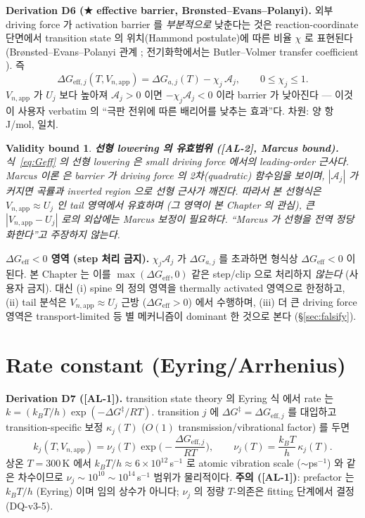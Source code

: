 \documentclass[11pt,a4paper]{article}
\newtheorem*{boundbox}{Validity bound}
\newcommand{\eff}{\mathrm{eff}}
\newcommand{\app}{\mathrm{app}}
\newcommand{\AL}[1]{\textsf{[AL-#1]}}
\begin{document}
\textbf{Derivation D6 (★ effective barrier, Brønsted--Evans--Polanyi).} 외부 driving
force 가 activation barrier 를 \emph{부분적으로} 낮춘다는 것은 reaction-coordinate
단면에서 transition state 의 위치(Hammond postulate)에 따른 비율 $\chi$ 로 표현된다
(Brønsted--Evans--Polanyi 관계 \cite{evanspolanyi1938}; 전기화학에서는 Butler--Volmer
transfer coefficient \cite{bardfaulkner}). 즉
\begin{equation}
\boxed{\;\Delta G_{\eff,j}(T,V_{n,\app}) = \Delta G_{a,j}(T) - \chi_j\,\mathcal A_j,
\qquad 0\le\chi_j\le1.\;}
\label{eq:Geff}
\end{equation}
$V_{n,\app}$ 가 $U_j$ 보다 높아져 $\mathcal A_j>0$ 이면 $-\chi_j\mathcal A_j<0$ 이라
barrier 가 낮아진다 — 이것이 사용자 verbatim 의 ``극판 전위에 따른 배리어를 낮추는
효과''다. 차원: 양 항 J/mol, 일치.

\begin{boundbox}
\textbf{선형 lowering 의 유효범위 (\AL{2}, Marcus bound).} 식~\eqref{eq:Geff} 의
선형 lowering 은 small driving force 에서의 leading-order 근사다. Marcus 이론
\cite{marcus1956} 은 barrier 가 driving force 의 \emph{2차(quadratic)} 함수임을 보이며,
$|\mathcal A_j|$ 가 커지면 곡률과 inverted region 으로 선형 근사가 깨진다. 따라서 본
선형식은 $V_{n,\app}\approx U_j$ 인 \emph{tail 영역}에서 유효하며 (그 영역이 본
Chapter 의 관심), 큰 $|V_{n,\app}-U_j|$ 로의 외삽에는 Marcus 보정이 필요하다. ``Marcus
가 선형을 전역 정당화한다''고 주장하지 않는다.
\end{boundbox}

\textbf{$\Delta G_\eff<0$ 영역 (step 처리 금지).} $\chi_j\mathcal A_j$ 가
$\Delta G_{a,j}$ 를 초과하면 형식상 $\Delta G_\eff<0$ 이 된다. 본 Chapter 는 이를
$\max(\Delta G_\eff,0)$ 같은 step/clip 으로 처리하지 \emph{않는다} (사용자 금지). 대신
(i) spine 의 정의 영역을 thermally activated 영역으로 한정하고, (ii) tail 분석은
$V_{n,\app}\approx U_j$ 근방 ($\Delta G_\eff>0$) 에서 수행하며, (iii) 더 큰 driving
force 영역은 transport-limited 등 별 메커니즘이 dominant 한 것으로 본다
(\S\ref{sec:falsify}).

\section{Rate constant (Eyring/Arrhenius)}\label{sec:rate}
\textbf{Derivation D7 (\AL{1}).} transition state theory 의 Eyring 식
\cite{eyring1935} 에서 rate 는 $k=(k_BT/h)\exp(-\Delta G^\ddagger/RT)$. transition $j$
에 $\Delta G^\ddagger=\Delta G_{\eff,j}$ 를 대입하고 transition-specific 보정
$\kappa_j(T)$ ($O(1)$ transmission/vibrational factor) 를 두면
\begin{equation}
\boxed{\;k_j(T,V_{n,\app}) = \nu_j(T)\exp\!\Big(-\frac{\Delta G_{\eff,j}}{RT}\Big),
\qquad \nu_j(T)=\frac{k_BT}{h}\,\kappa_j(T).\;}
\label{eq:rate}
\end{equation}
상온 $T=300$\,K 에서 $k_BT/h\approx6\times10^{12}$\,s$^{-1}$ 로 atomic vibration scale
($\sim$ps$^{-1}$) 와 같은 차수이므로 $\nu_j\sim10^{10}\!\sim\!10^{14}$\,s$^{-1}$ 범위가
물리적이다. \textbf{주의 (\AL{1})}: prefactor 는 $k_BT/h$ (Eyring) 이며 임의 상수가
아니다; $\nu_j$ 의 정량 $T$-의존은 fitting 단계에서 결정 (DQ-v3-5).
\end{document}
